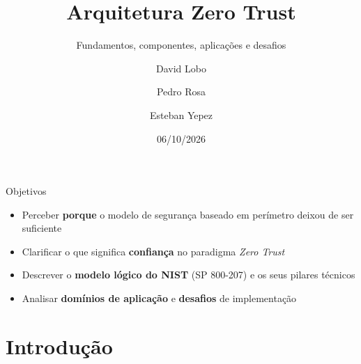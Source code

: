 \documentclass[aspectratio=169,11pt]{beamer}
\title{Arquitetura Zero Trust}
\subtitle{Fundamentos, componentes, aplicações e desafios}
\author{David Lobo \and Pedro Rosa \and Esteban Yepez}
\institute{Universidade do Minho \\ Sistemas de Comunicações e Redes}
\date{06/10/2026}
\begin{document}
\begin{frame}
  \titlepage
\end{frame}

\begin{frame}{Objetivos}
  \begin{itemize}
    \item Perceber \textbf{porque} o modelo de segurança baseado em perímetro deixou de ser suficiente
    \item Clarificar o que significa \textbf{confiança} no paradigma \textit{Zero Trust}
    \item Descrever o \textbf{modelo lógico do NIST} (SP 800-207) e os seus pilares técnicos
    \item Analisar \textbf{domínios de aplicação} e \textbf{desafios} de implementação
  \end{itemize}
\end{frame}

\section{Introdução}
\end{document}
